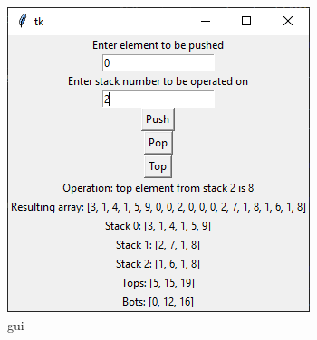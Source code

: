 \documentclass[12pt]{report}
\begin{document}
\begin{figure}[ht]
    \centering
    \includegraphics[]{gui}
    \caption{gui}
\end{figure}
\end{document}
